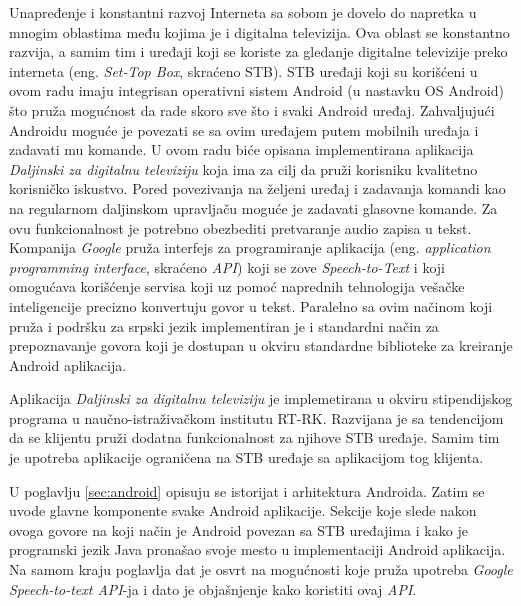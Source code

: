 \documentclass[TamaraIvanovicMasterRad.tex]{subfiles}
\begin{document}
Unapređenje i konstantni razvoj Interneta sa sobom je dovelo do napretka u mnogim oblastima među kojima je i digitalna televizija. Ova oblast se konstantno razvija, a samim tim i uređaji koji se koriste za gledanje digitalne televizije preko interneta (eng. \textit{Set-Top Box}, skraćeno STB). STB uređaji koji su korišćeni u ovom radu imaju integrisan operativni sistem Android (u nastavku OS Android) \cite{book:oreillycookbook} što pruža mogućnost da rade skoro sve što i svaki Android uređaj. Zahvaljujući Androidu moguće je povezati se sa ovim uređajem putem mobilnih uređaja i zadavati mu komande. U ovom radu biće opisana implementirana aplikacija \textit{Daljinski za digitalnu televiziju} koja ima za cilj da pruži korisniku kvalitetno korisničko iskustvo. Pored povezivanja na željeni uređaj i zadavanja komandi kao na regularnom daljinskom upravljaču moguće je zadavati glasovne komande. Za ovu funkcionalnost je potrebno obezbediti pretvaranje audio zapisa u tekst. Kompanija \textit{Google} pruža interfejs za programiranje aplikacija (eng. \textit{application programming interface}, skraćeno \textit{API}) \cite{sajt:googleCloudApis} koji se zove \textit{Speech-to-Text} \cite{sajt:googleSTT} i koji omogućava korišćenje servisa koji uz pomoć naprednih tehnologija vešačke inteligencije precizno konvertuju govor u tekst. Paralelno sa ovim načinom koji pruža i podršku za srpski jezik implementiran je i standardni način za prepoznavanje govora koji je dostupan u okviru standardne biblioteke za kreiranje Android aplikacija. 

Aplikacija \textit{Daljinski za digitalnu televiziju} je implemetirana u okviru stipendijskog programa u naučno-istraživačkom institutu RT-RK. Razvijana je sa tendencijom da se klijentu pruži dodatna funkcionalnost za njihove STB uređaje. Samim tim je upotreba aplikacije ograničena na STB uređaje sa aplikacijom tog klijenta.

U poglavlju \ref{sec:android} opisuju se istorijat i arhitektura Androida. Zatim se uvode glavne komponente svake Android aplikacije. Sekcije koje slede nakon ovoga govore na koji način je Android povezan sa STB uređajima i kako je programski jezik Java pronašao svoje mesto u implementaciji Android aplikacija. Na samom kraju poglavlja dat je osvrt na mogućnosti koje pruža upotreba \textit{Google Speech-to-text API}-ja i dato je objašnjenje kako koristiti ovaj \textit{API}.
\end{document}

